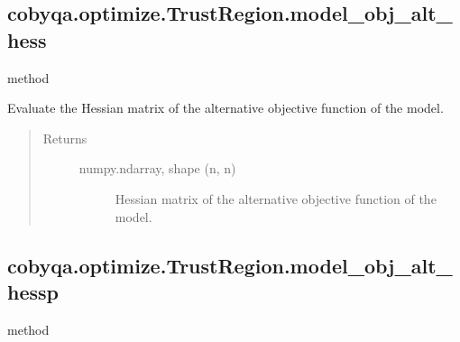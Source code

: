 \documentclass[letterpaper,10pt,english]{sphinxmanual}
\begin{document}
\begin{fulllineitems}
\begin{fulllineitems}
\end{fulllineitems}



\subsection{cobyqa.optimize.TrustRegion.model\_obj\_alt\_hess}
\label{\detokenize{refs/generated/cobyqa.optimize.TrustRegion.model_obj_alt_hess:cobyqa-optimize-trustregion-model-obj-alt-hess}}\label{\detokenize{refs/generated/cobyqa.optimize.TrustRegion.model_obj_alt_hess::doc}}
\sphinxAtStartPar
method

\begin{fulllineitems}
\label{\detokenize{refs/generated/cobyqa.optimize.TrustRegion.model_obj_alt_hess:cobyqa.optimize.TrustRegion.model_obj_alt_hess}}
\sphinxAtStartPar
Evaluate the Hessian matrix of the alternative objective function of the
model.
\begin{quote}\begin{description}
\item[{Returns}] \leavevmode\begin{description}
\item[{numpy.ndarray, shape (n, n)}] \leavevmode
\sphinxAtStartPar
Hessian matrix of the alternative objective function of the model.

\end{description}

\end{description}\end{quote}

\end{fulllineitems}



\subsection{cobyqa.optimize.TrustRegion.model\_obj\_alt\_hessp}
\label{\detokenize{refs/generated/cobyqa.optimize.TrustRegion.model_obj_alt_hessp:cobyqa-optimize-trustregion-model-obj-alt-hessp}}\label{\detokenize{refs/generated/cobyqa.optimize.TrustRegion.model_obj_alt_hessp::doc}}
\sphinxAtStartPar
method


\end{fulllineitems}
\end{document}
